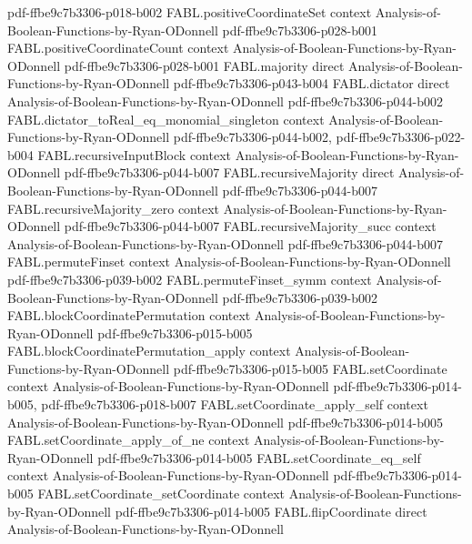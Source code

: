 \begin{theorem}
  {pdf-ffbe9c7b3306-p018-b002}
\proofstep
  {FABL.positiveCoordinateSet}
  {context}
  {Analysis-of-Boolean-Functions-by-Ryan-ODonnell}
  {pdf-ffbe9c7b3306-p028-b001}
\proofstep
  {FABL.positiveCoordinateCount}
  {context}
  {Analysis-of-Boolean-Functions-by-Ryan-ODonnell}
  {pdf-ffbe9c7b3306-p028-b001}
\proofstep
  {FABL.majority}
  {direct}
  {Analysis-of-Boolean-Functions-by-Ryan-ODonnell}
  {pdf-ffbe9c7b3306-p043-b004}
\proofstep
  {FABL.dictator}
  {direct}
  {Analysis-of-Boolean-Functions-by-Ryan-ODonnell}
  {pdf-ffbe9c7b3306-p044-b002}
\proofstep
  {FABL.dictator_toReal_eq_monomial_singleton}
  {context}
  {Analysis-of-Boolean-Functions-by-Ryan-ODonnell}
  {pdf-ffbe9c7b3306-p044-b002,
    pdf-ffbe9c7b3306-p022-b004}
\proofstep
  {FABL.recursiveInputBlock}
  {context}
  {Analysis-of-Boolean-Functions-by-Ryan-ODonnell}
  {pdf-ffbe9c7b3306-p044-b007}
\proofstep
  {FABL.recursiveMajority}
  {direct}
  {Analysis-of-Boolean-Functions-by-Ryan-ODonnell}
  {pdf-ffbe9c7b3306-p044-b007}
\proofstep
  {FABL.recursiveMajority_zero}
  {context}
  {Analysis-of-Boolean-Functions-by-Ryan-ODonnell}
  {pdf-ffbe9c7b3306-p044-b007}
\proofstep
  {FABL.recursiveMajority_succ}
  {context}
  {Analysis-of-Boolean-Functions-by-Ryan-ODonnell}
  {pdf-ffbe9c7b3306-p044-b007}
\proofstep
  {FABL.permuteFinset}
  {context}
  {Analysis-of-Boolean-Functions-by-Ryan-ODonnell}
  {pdf-ffbe9c7b3306-p039-b002}
\proofstep
  {FABL.permuteFinset_symm}
  {context}
  {Analysis-of-Boolean-Functions-by-Ryan-ODonnell}
  {pdf-ffbe9c7b3306-p039-b002}
\proofstep
  {FABL.blockCoordinatePermutation}
  {context}
  {Analysis-of-Boolean-Functions-by-Ryan-ODonnell}
  {pdf-ffbe9c7b3306-p015-b005}
\proofstep
  {FABL.blockCoordinatePermutation_apply}
  {context}
  {Analysis-of-Boolean-Functions-by-Ryan-ODonnell}
  {pdf-ffbe9c7b3306-p015-b005}
\proofstep
  {FABL.setCoordinate}
  {context}
  {Analysis-of-Boolean-Functions-by-Ryan-ODonnell}
  {pdf-ffbe9c7b3306-p014-b005,
    pdf-ffbe9c7b3306-p018-b007}
\proofstep
  {FABL.setCoordinate_apply_self}
  {context}
  {Analysis-of-Boolean-Functions-by-Ryan-ODonnell}
  {pdf-ffbe9c7b3306-p014-b005}
\proofstep
  {FABL.setCoordinate_apply_of_ne}
  {context}
  {Analysis-of-Boolean-Functions-by-Ryan-ODonnell}
  {pdf-ffbe9c7b3306-p014-b005}
\proofstep
  {FABL.setCoordinate_eq_self}
  {context}
  {Analysis-of-Boolean-Functions-by-Ryan-ODonnell}
  {pdf-ffbe9c7b3306-p014-b005}
\proofstep
  {FABL.setCoordinate_setCoordinate}
  {context}
  {Analysis-of-Boolean-Functions-by-Ryan-ODonnell}
  {pdf-ffbe9c7b3306-p014-b005}
\proofstep
  {FABL.flipCoordinate}
  {direct}
  {Analysis-of-Boolean-Functions-by-Ryan-ODonnell}

\end{theorem}
